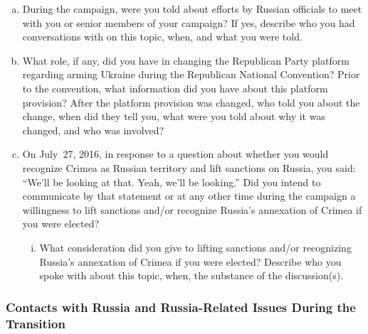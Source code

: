 \begin{enumerate}[a.]
\item During the campaign, were you told about efforts by Russian officials to meet with you or senior members of your campaign?
If yes, describe who you had conversations with on this topic, when, and what you were told.

\item What role, if any, did you have in changing the Republican Party platform regarding arming Ukraine during the Republican National Convention?
Prior to the convention, what information did you have about this platform provision?
After the platform provision was changed, who told you about the change, when did they tell you, what were you told about why it was changed, and who was involved?

\item On July~27, 2016, in response to a question about whether you would recognize Crimea as Russian territory and lift sanctions on Russia, you said: ``We'll be looking at that. Yeah, we'll be looking.''
Did you intend to communicate by that statement or at any other time during the campaign a willingness to lift sanctions and/or recognize Russia's annexation of Crimea if you were elected?

\begin{enumerate}[i.]

\item What consideration did you give to lifting sanctions and/or recognizing Russia's annexation of Crimea if you were elected?
Describe who you spoke with about this topic, when, the substance of the discussion(s).

\end{enumerate}

\end{enumerate}

\subsubsection{Contacts with Russia and Russia-Related Issues During the Transition}

